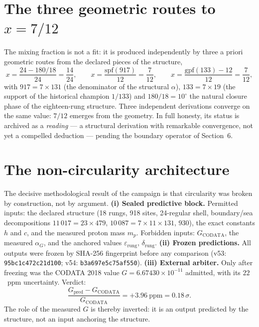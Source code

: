 \documentclass[11pt,a4paper]{article}
\begin{document}
\section{The three geometric routes to $x = 7/12$}
The mixing fraction is not a fit: it is produced independently by three a priori geometric routes from the declared pieces of the structure,
\begin{equation}
x = \frac{24 - 180/18}{24} = \frac{14}{24}, \qquad
x = \frac{\mathrm{spf}(917)}{12} = \frac{7}{12}, \qquad
x = \frac{\mathrm{gpf}(133) - 12}{12} = \frac{7}{12},
\end{equation}
with $917 = 7\times131$ (the denominator of the structural $\alpha$), $133 = 7\times19$ (the support of the historical champion $1/133$) and $180/18 = 10^\circ$ the natural closure phase of the eighteen-rung structure. Three independent derivations converge on the same value: $7/12$ emerges from the geometry. In full honesty, its status is archived as a \emph{reading} --- a structural derivation with remarkable convergence, not yet a compelled deduction --- pending the boundary operator of Section~6.

\section{The non-circularity architecture}
The decisive methodological result of the campaign is that circularity was broken by construction, not by argument. \textbf{(i) Sealed predictive block.} Permitted inputs: the declared structure (18 rungs, 918 sites, 24-regular shell, boundary/sea decompositions $11\,017 = 23\times479$, $10\,087 = 7\times11\times131$, $930$), the exact constants $h$ and $c$, and the measured proton mass $m_p$. Forbidden inputs: $G_{\mathrm{CODATA}}$, the measured $\alpha_G$, and the anchored values $\varepsilon_{\mathrm{rung}}$, $\delta_{\mathrm{rung}}$. \textbf{(ii) Frozen predictions.} All outputs were frozen by SHA-256 fingerprint before any comparison (v53: \texttt{95bc1c472c21d100}; v54: \texttt{b3a697e5c75af550}). \textbf{(iii) External arbiter.} Only after freezing was the CODATA 2018 value $G = 6.67430\times10^{-11}$ admitted, with its $22$~ppm uncertainty. Verdict:
\begin{equation}
\frac{G_{\mathrm{pred}} - G_{\mathrm{CODATA}}}{G_{\mathrm{CODATA}}} = +3.96\ \mathrm{ppm} = 0.18\,\sigma .
\end{equation}
The role of the measured $G$ is thereby inverted: it is an output predicted by the structure, not an input anchoring the structure.
\end{document}
